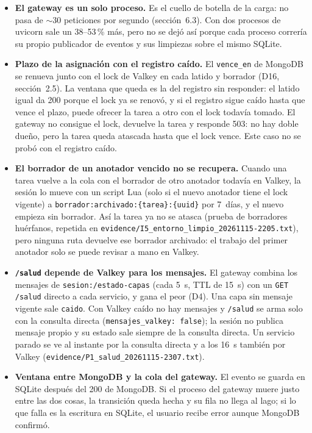 \documentclass[10pt,letterpaper]{article}
\newcommand{\ev}[1]{{\footnotesize\texttt{evidence/\allowbreak #1}}}
\begin{document}
\begin{itemize}\setlength{\itemsep}{1pt}
\item \textbf{El gateway es un solo proceso.} Es el cuello de botella de la carga: no pasa de $\sim$30
peticiones por segundo (sección~6.3). Con dos procesos de uvicorn sale un 38--53\,\% más, pero no se dejó así
porque cada proceso correría su propio publicador de eventos y sus limpiezas sobre el mismo SQLite.
\item \textbf{Plazo de la asignación con el registro caído.} El \texttt{vence\_en} de MongoDB se renueva
junto con el lock de Valkey en cada latido y borrador (D16, sección~2.5). La ventana que queda es la del
registro sin responder: el latido igual da 200 porque el lock ya se renovó, y si el registro sigue caído
hasta que vence el plazo, puede ofrecer la tarea a otro con el lock todavía tomado. El gateway no consigue el
lock, devuelve la tarea y responde 503: no hay doble dueño, pero la tarea queda atascada hasta que el lock
vence. Este caso no se probó con el registro caído.
\item \textbf{El borrador de un anotador vencido no se recupera.} Cuando una tarea vuelve a la cola con el
borrador de otro anotador todavía en Valkey, la sesión lo mueve con un script Lua (solo si el nuevo anotador
tiene el lock vigente) a \texttt{borrador:archivado:\{tarea\}:\{uuid\}} por 7~días, y el nuevo empieza sin
borrador. Así la tarea ya no se atasca (prueba de borradores huérfanos, repetida en
\ev{I5\_entorno\_limpio\_20261115-2205.txt}), pero ninguna ruta devuelve ese borrador archivado: el trabajo
del primer anotador solo se puede revisar a mano en Valkey.
\item \textbf{\texttt{/salud} depende de Valkey para los mensajes.} El gateway combina los mensajes de
\texttt{sesion:/estado-capas} (cada 5~s, TTL de 15~s) con un \texttt{GET /salud} directo a cada servicio, y
gana el peor (D4). Una capa sin mensaje vigente sale \texttt{caido}. Con Valkey caído no hay mensajes y
\texttt{/salud} se arma solo con la consulta directa (\texttt{mensajes\_valkey: false}); la sesión no publica
mensaje propio y su estado sale siempre de la consulta directa. Un servicio parado se ve al instante por la
consulta directa y a los 16~s también por Valkey (\ev{P1\_salud\_20261115-2307.txt}).
\item \textbf{Ventana entre MongoDB y la cola del gateway.} El evento se guarda en SQLite después del 200 de
MongoDB. Si el proceso del gateway muere justo entre las dos cosas, la transición queda hecha y su fila no
llega al lago; si lo que falla es la escritura en SQLite, el usuario recibe error aunque MongoDB confirmó.

\end{itemize}
\end{document}
